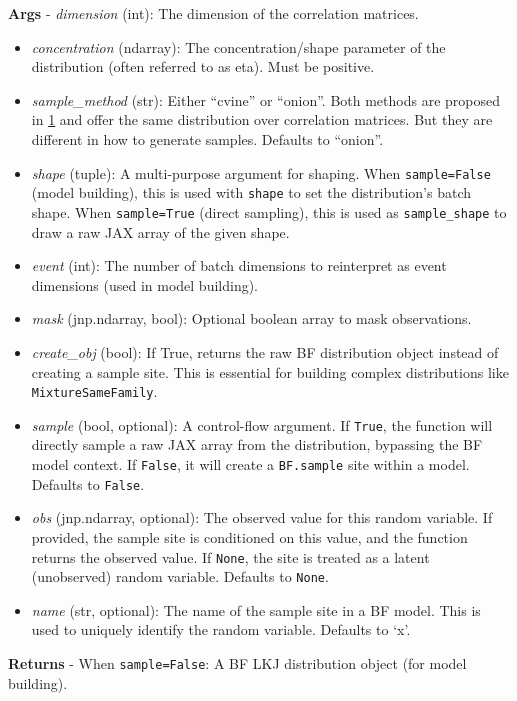\documentclass[
  letterpaper,
  DIV=11,
  numbers=noendperiod]{scrartcl}
\begin{document}
\textbf{Args} - \emph{dimension} (int): The dimension of the correlation
matrices.

\begin{itemize}
\item
  \emph{concentration} (ndarray): The concentration/shape parameter of
  the distribution (often referred to as eta). Must be positive.
\item
  \emph{sample\_method} (str): Either ``cvine'' or ``onion''. Both
  methods are proposed in
  \href{https://en.wikipedia.org/wiki/Matrix_normal_distribution}{1} and
  offer the same distribution over correlation matrices. But they are
  different in how to generate samples. Defaults to ``onion''.
\item
  \emph{shape} (tuple): A multi-purpose argument for shaping. When
  \texttt{sample=False} (model building), this is used with
  \texttt{shape} to set the distribution's batch shape. When
  \texttt{sample=True} (direct sampling), this is used as
  \texttt{sample\_shape} to draw a raw JAX array of the given shape.
\item
  \emph{event} (int): The number of batch dimensions to reinterpret as
  event dimensions (used in model building).
\item
  \emph{mask} (jnp.ndarray, bool): Optional boolean array to mask
  observations.
\item
  \emph{create\_obj} (bool): If True, returns the raw BF distribution
  object instead of creating a sample site. This is essential for
  building complex distributions like \texttt{MixtureSameFamily}.
\item
  \emph{sample} (bool, optional): A control-flow argument. If
  \texttt{True}, the function will directly sample a raw JAX array from
  the distribution, bypassing the BF model context. If \texttt{False},
  it will create a \texttt{BF.sample} site within a model. Defaults to
  \texttt{False}.
\item
  \emph{obs} (jnp.ndarray, optional): The observed value for this random
  variable. If provided, the sample site is conditioned on this value,
  and the function returns the observed value. If \texttt{None}, the
  site is treated as a latent (unobserved) random variable. Defaults to
  \texttt{None}.
\item
  \emph{name} (str, optional): The name of the sample site in a BF
  model. This is used to uniquely identify the random variable. Defaults
  to `x'.
\end{itemize}

\textbf{Returns} - When \texttt{sample=False}: A BF LKJ distribution
object (for model building).
\end{document}
